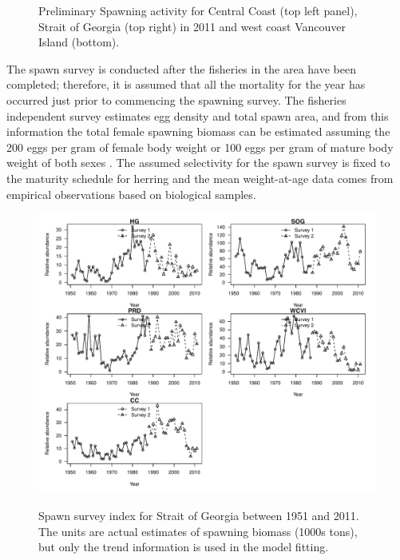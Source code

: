 \begin{figure}[!tbp]
	\caption{Preliminary Spawning activity for Central Coast (top left panel), Strait of Georgia (top right) in 2011 and west coast Vancouver Island (bottom).}\label{figSpawnMaps}
\end{figure}

	The spawn survey is conducted after the fisheries in the area have been completed; therefore, it is assumed that all the mortality for the year has occurred just prior to commencing the spawning survey. The fisheries independent survey estimates egg density and total spawn area, and from this information the total female spawning biomass can be estimated assuming the 200 eggs per gram of female body weight or 100 eggs per gram of mature body weight of both sexes \citep{hay1985reproductive,hardwick1973biomass}. The assumed selectivity for the spawn survey is fixed to the maturity schedule for herring and the mean weight-at-age data comes from empirical observations based on biological samples.  	
	
\begin{figure}[!tbp]
	\includegraphics[width=\textwidth]{../Figs/iscam_fig_SurveyMajorAreas.pdf}\\
	\caption{Spawn survey index for Strait of Georgia between 1951 and 2011. The units are actual estimates of spawning biomass (1000s tons), but only the trend information is used in the model fitting.}\label{FigSurvey}
\end{figure}
	
